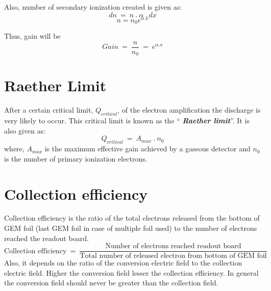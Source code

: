 Also, number of secondary ionization created is given as:
\begin{equation}
	dn~=~n~.~\alpha~.~dx
\end{equation}
\begin{equation}
	n=n_0 e^{\alpha.x}
\end{equation}

Thus, gain will be
\begin{equation}
	Gain~=~\frac{n}{n_0}~=~e^{\alpha.x}
\end{equation}

\section{Raether Limit} %
\label{sec:raether_limit}
After a certain critical limit, $Q_{critical}$, of the electron amplification the discharge is very likely to occur. This critical limit is known as the ``\textit{ \textbf{Raether limit}}''.
It is also given as:
\begin{equation}
	Q_{critical}~=~A_{max}~.~n_0
\end{equation}
where, $A_{max}$ is the maximum effective gain achieved by a gaseous detector and $n_0$ is the number of primary ionization electrons.

\section{Collection efficiency} %
\label{sec:collection_efficiency}
Collection efficiency is the ratio of the total electrons released from the bottom of GEM foil (last GEM foil in case of multiple foil used) to the number of electrons reached the readout board. 
\begin{equation}
	\text{Collection efficiency}~=~\frac{\text{Number of electrons reached readout board}}{\text{Total number of released electron from bottom of GEM foil}}
\end{equation}
Also, it depends on the ratio of the conversion electric field to the collection electric field. Higher the conversion field lesser the collection efficiency. In general the conversion field should never be greater than the collection field. 



